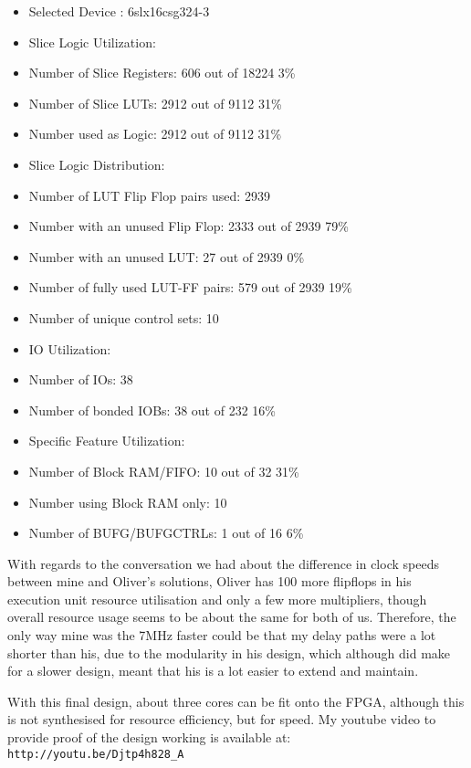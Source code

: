 \documentclass[11pt, oneside, titlepage]{article}
\begin{document}
\begin{itemize}

  \item Selected Device : 6slx16csg324-3 

  \item Slice Logic Utilization: 
  \item  Number of Slice Registers:             606  out of  18224     3\%  
  \item  Number of Slice LUTs:                 2912  out of   9112    31\%  
  \item     Number used as Logic:              2912  out of   9112    31\%  
\newpage
  \item Slice Logic Distribution: 
  \item  Number of LUT Flip Flop pairs used:   2939
  \item    Number with an unused Flip Flop:    2333  out of   2939    79\%  
  \item    Number with an unused LUT:            27  out of   2939     0\%  
  \item    Number of fully used LUT-FF pairs:   579  out of   2939    19\%  
  \item    Number of unique control sets:        10

  \item IO Utilization: 
  \item Number of IOs:                          38
  \item  Number of bonded IOBs:                  38  out of    232    16\%  

  \item Specific Feature Utilization:
  \item  Number of Block RAM/FIFO:               10  out of     32    31\%  
  \item     Number using Block RAM only:         10
  \item  Number of BUFG/BUFGCTRLs:                1  out of     16     6\%  
  
\end{itemize}

With regards to the conversation we had about the difference in clock speeds between mine and Oliver's solutions, Oliver has 100 more flipflops in his execution unit resource utilisation and only a few more multipliers, though overall resource usage seems to be about the same for both of us. Therefore, the only way mine was the 7MHz faster could be that my delay paths were a lot shorter than his, due to the modularity in his design, which although did make for a slower design, meant that his is a lot easier to extend and maintain.

With this final design, about three cores can be fit onto the FPGA, although this is not synthesised for resource efficiency, but for speed. My youtube video to provide proof of the design working is available at: \verb!http://youtu.be/Djtp4h828_A!
\end{document}
